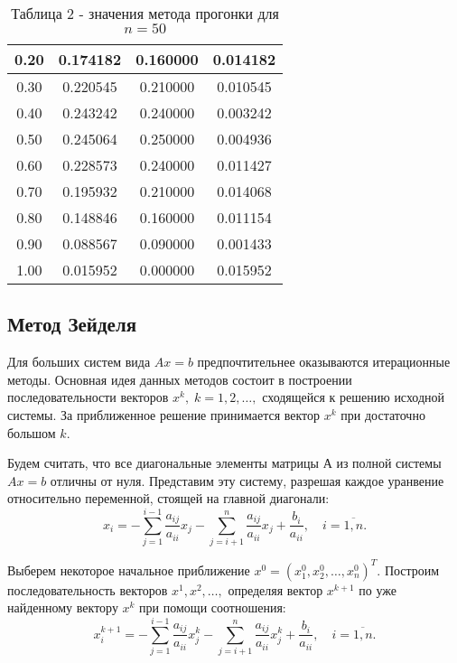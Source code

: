 \documentclass[a4paper,12pt]{article}
\begin{document}
{\begin{table}[h]
\begin{tabular}{|c|c|c|c|}
				\hline
				0.20 & 0.174182 & 0.160000 & 0.014182 \\
				\hline
				0.30 & 0.220545 & 0.210000 & 0.010545 \\
				\hline
				0.40 & 0.243242 & 0.240000 & 0.003242 \\
				\hline
				0.50 & 0.245064 & 0.250000 & 0.004936 \\
				\hline
				0.60 & 0.228573 & 0.240000 & 0.011427 \\
				\hline
				0.70 & 0.195932 & 0.210000 & 0.014068 \\
				\hline
				0.80 & 0.148846 & 0.160000 & 0.011154 \\
				\hline
				0.90 & 0.088567 & 0.090000 & 0.001433 \\
				\hline
				1.00 & 0.015952 & 0.000000 & 0.015952 \\
				\hline
			\end{tabular}
			\caption*{\small{Таблица 2 - значения метода прогонки для $n = 50$}}
		\end{table}
		\subsection{Метод Зейделя}
		\hspace*{1.25cm}Для больших систем вида $Ax=b$ предпочтительнее оказываются итерационные методы. 
		Основная идея данных методов состоит в построении последовательности векторов $x^k, \; k=1,2,\dots,$ 
		сходящейся к решению исходной системы. За приближенное решение принимается вектор $x^k$ при достаточно большом $k$.
		
		Будем считать, что все диагональные элементы матрицы $А$ из полной системы $Ax=b$ отличны от нуля. 
		Представим эту систему, разрешая каждое уранвение относительно переменной, стоящей на главной диагонали: 
		\begin{equation}
			x_i = - \sum\limits_{j=1}^{i-1} \frac{a_{ij}}{a_{ii}}x_j - \sum\limits_{j=i+1}^n \frac{a_{ij}}{a_{ii}}x_j+\frac{b_i}{a_{ii}}, \quad i = \overline{1,n}.
			\label{5}
		\end{equation}
		
		Выберем некоторое начальное приближение $x^0=(x_1^0, x_2^0, {\dots}, x_n^0)^T$. 
		Построим последова\-тель\-ность векторов $x^1, x^2, {\dots},$ определяя вектор $x^{k+1}$ по уже найденному вектору $x^k$ при помощи соотношения: 
		\begin{equation}
			x_i^{k+1}= - \sum\limits_{j=1}^{i-1} \frac{a_{ij}}{a_{ii}}x_j^k - \sum\limits_{j=i+1}^n \frac{a_{ij}}{a_{ii}}x_j^k+\frac{b_i}{a_{ii}}, \quad i = \overline{1,n}. 
			\label{6}
		\end{equation}
		
}
\end{document}

